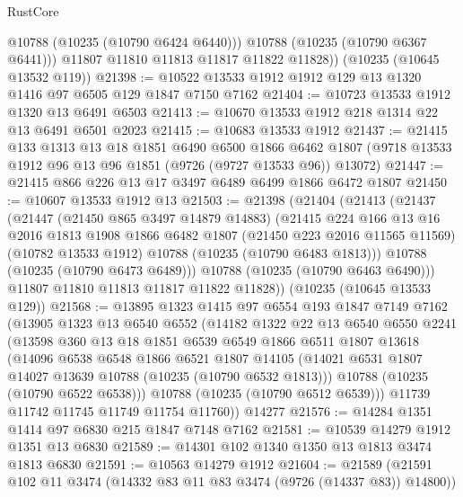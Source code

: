 \begin{lexlean}{RustCore}
\begin{coremodule}
            @10788
            (@10235 (@10790 @6424 @6440)))
          @10788
          (@10235 (@10790 @6367 @6441)))
        @11807
        @11810
        @11813
        @11817
        @11822
        @11828))
    (@10235 (@10645 @13532 @119))
@21398 := @10522 @13533 @1912 @1912 @129 @13 @1320 @1416 @97 @6505 @129 @1847 @7150 @7162
@21404 := @10723 @13533 @1912 @1320 @13 @6491 @6503
@21413 := @10670 @13533 @1912 @218 @1314 @22 @13 @6491 @6501 @2023
@21415 := @10683 @13533 @1912
@21437 := @21415
    @133
    @1313
    @13
    @18
    @1851
    @6490
    @6500
    @1866
    @6462
    @1807
    (@9718 @13533 @1912 @96 @13 @96 @1851 (@9726 (@9727 @13533 @96)) @13072)
@21447 := @21415 @866 @226 @13 @17 @3497 @6489 @6499 @1866 @6472 @1807
@21450 := @10607 @13533 @1912 @13
@21503 := @21398
    (@21404
      (@21413
        (@21437
          (@21447
            (@21450 @865 @3497 @14879 @14883)
            (@21415
              @224
              @166
              @13
              @16
              @2016
              @1813
              @1908
              @1866
              @6482
              @1807
              (@21450 @223 @2016 @11565 @11569)
              (@10782 @13533 @1912)
              @10788
              (@10235 (@10790 @6483 @1813)))
            @10788
            (@10235 (@10790 @6473 @6489)))
          @10788
          (@10235 (@10790 @6463 @6490)))
        @11807
        @11810
        @11813
        @11817
        @11822
        @11828))
    (@10235 (@10645 @13533 @129))
@21568 := @13895
    @1323
    @1415
    @97
    @6554
    @193
    @1847
    @7149
    @7162
    (@13905
      @1323
      @13
      @6540
      @6552
      (@14182
        @1322
        @22
        @13
        @6540
        @6550
        @2241
        (@13598
          @360
          @13
          @18
          @1851
          @6539
          @6549
          @1866
          @6511
          @1807
          @13618
          (@14096
            @6538
            @6548
            @1866
            @6521
            @1807
            @14105
            (@14021 @6531 @1807 @14027 @13639 @10788 (@10235 (@10790 @6532 @1813)))
            @10788
            (@10235 (@10790 @6522 @6538)))
          @10788
          (@10235 (@10790 @6512 @6539)))
        @11739
        @11742
        @11745
        @11749
        @11754
        @11760))
    @14277
@21576 := @14284 @1351 @1414 @97 @6830 @215 @1847 @7148 @7162
@21581 := @10539 @14279 @1912 @1351 @13 @6830
@21589 := @14301 @102 @1340 @1350 @13 @1813 @3474 @1813 @6830
@21591 := @10563 @14279 @1912
@21604 := @21589 (@21591 @102 @11 @3474 (@14332 @83 @11 @83 @3474 (@9726 (@14337 @83)) @14800))

\end{coremodule}
\end{lexlean}
